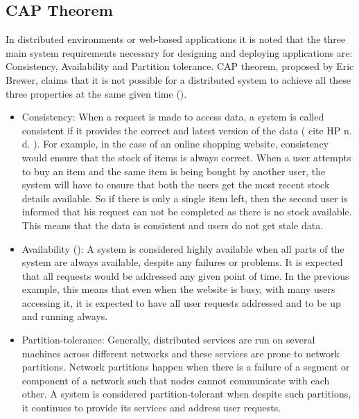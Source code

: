 \subsection{CAP Theorem} \label{ss:cap}
In distributed environments or web-based applications it is noted that the
three main system requirements necessary for designing and deploying
applications are: Consistency,   Availability and Partition tolerance.  CAP
theorem, proposed by Eric Brewer, claims that it is not possible for a
distributed system to achieve all these three properties at the same given time
().

\begin{itemize}
  
	  \item Consistency: When a request is made to access data,   a system is called
	  consistent if it provides the correct and latest version of the data (\todo
	  {cite HP n. d. }).  For example,   in the case of an online shopping website,
	  consistency would ensure that the stock of items is always correct.  When a
	  user attempts to buy an item and the same item is being bought by another
	  user,   the system will have to ensure that both the users get the most recent
	  stock details available.  So if there is only a single item left,   then the
	second user is informed that his request can not be completed as there is no
	stock available.  This means that the data is consistent and users do not get
	stale data.
	
	  \item Availability (): A system is
	  considered highly available when all parts of the system are always available,
	    despite any failures or problems.  It is expected that all requests would be
	  addressed any given point of time.  In the previous example,   this means that
	  even when the
	website is busy,   with many users accessing it,   it is expected to have all
	user requests addressed and to be up and running always.
	
	\item Partition-tolerance: Generally, distributed services are run on several
	machines across different networks and these services are prone to network
	partitions. Network partitions happen when there is a failure of a segment or
	component of a network such that nodes cannot communicate with each other.
	A system is considered  partition-tolerant when despite such partitions,   it
	continues to provide its services and address user requests.
\end{itemize}

